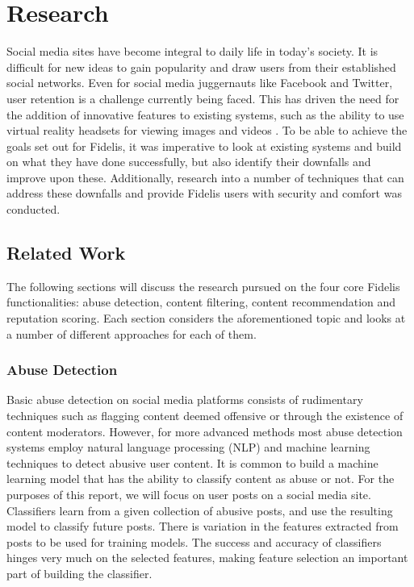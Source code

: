 \chapter{Research}
\label{Chapter:Research}
Social media sites have become integral to daily life in today's society. It is difficult for new ideas to gain popularity and draw users from their established social networks. Even for social media juggernauts like Facebook and Twitter, user retention is a challenge currently being faced. This has driven the need for the addition of innovative features to existing systems, such as the ability to use virtual reality headsets for viewing images and videos \cite{Facebook:VR}. To be able to achieve the goals set out for Fidelis, it was imperative to look at existing systems and build on what they have done successfully, but also identify their downfalls and improve upon these. Additionally, research into a number of techniques that can address these downfalls and provide Fidelis users with security and comfort was conducted.

\section{Related Work}
The following sections will discuss the research pursued on the four core Fidelis functionalities: abuse detection, content filtering, content recommendation and reputation scoring. Each section considers the aforementioned topic and looks at a number of different approaches for each of them.

\subsection{Abuse Detection}
Basic abuse detection on social media platforms consists of rudimentary techniques such as flagging content deemed offensive or through the existence of content moderators. However, for more advanced methods most abuse detection systems employ natural language processing (NLP) and machine learning techniques to detect abusive user content. It is common to build a machine learning model that has the ability to classify content as abuse or not. For the purposes of this report, we will focus on user posts on a social media site. Classifiers learn from a given collection of abusive posts, and use the resulting model to classify future posts. There is variation in the features extracted from posts to be used for training models. The success and accuracy of classifiers hinges very much on the selected features, making feature selection an important part of building the classifier.

